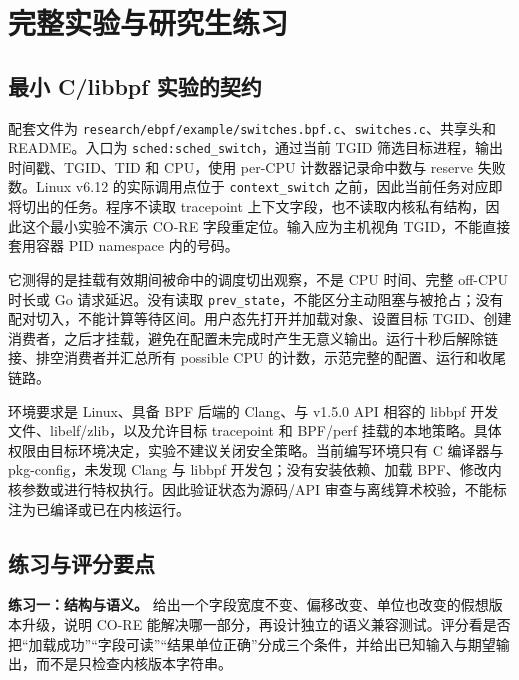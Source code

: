 \documentclass[UTF8,fontset=fandol,openany,11pt]{ctexbook}
\begin{document}
\section{完整实验与研究生练习}

\subsection{最小 C/libbpf 实验的契约}

配套文件为 \texttt{research/\allowbreak{}ebpf/\allowbreak{}example/\allowbreak{}switches.\allowbreak{}bpf.\allowbreak{}c}、\texttt{switches.\allowbreak{}c}、共享头和 README。入口为 \texttt{sched:sched\_\allowbreak{}switch}，通过当前 TGID 筛选目标进程，输出时间戳、TGID、TID 和 CPU，使用 per-CPU 计数器记录命中数与 reserve 失败数。Linux v6.12 的实际调用点位于 \texttt{context\_\allowbreak{}switch} 之前，因此当前任务对应即将切出的任务。程序不读取 tracepoint 上下文字段，也不读取内核私有结构，因此这个最小实验不演示 CO-RE 字段重定位。输入应为主机视角 TGID，不能直接套用容器 PID namespace 内的号码。\cite{eb-sched-core}\cite{eb-sched-trace}\cite{eb-stack-helper}\cite{eb-attach-api}


它测得的是挂载有效期间被命中的调度切出观察，不是 CPU 时间、完整 off-CPU 时长或 Go 请求延迟。没有读取 \texttt{prev\_\allowbreak{}state}，不能区分主动阻塞与被抢占；没有配对切入，不能计算等待区间。用户态先打开并加载对象、设置目标 TGID、创建消费者，之后才挂载，避免在配置未完成时产生无意义输出。运行十秒后解除链接、排空消费者并汇总所有 possible CPU 的计数，示范完整的配置、运行和收尾链路。\cite{eb-sched-trace}\cite{eb-sched-core}\cite{eb-attach-api}


环境要求是 Linux、具备 BPF 后端的 Clang、与 v1.5.0 API 相容的 libbpf 开发文件、libelf/zlib，以及允许目标 tracepoint 和 BPF/perf 挂载的本地策略。具体权限由目标环境决定，实验不建议关闭安全策略。当前编写环境只有 C 编译器与 pkg-config，未发现 Clang 与 libbpf 开发包；没有安装依赖、加载 BPF、修改内核参数或进行特权执行。因此验证状态为源码/API 审查与离线算术校验，不能标注为已编译或已在内核运行。\cite{eb-load-syscall}\cite{eb-attach-api}


\subsection{练习与评分要点}

\textbf{练习一：结构与语义。} 给出一个字段宽度不变、偏移改变、单位也改变的假想版本升级，说明 CO-RE 能解决哪一部分，再设计独立的语义兼容测试。评分看是否把“加载成功”“字段可读”“结果单位正确”分成三个条件，并给出已知输入与期望输出，而不是只检查内核版本字符串。\cite{eb-core-relo}
\end{document}
